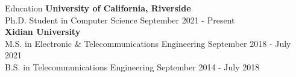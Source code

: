 \documentclass{resume} %
\begin{document}
\begin{rSection}{Education}
\textbf{University of California, Riverside}\\
Ph.D. Student in Computer Science \hfill {September 2021 - Present}\\
{\bf Xidian University} \\
M.S. in Electronic \& Telecommunications Engineering \hfill {September 2018 - July 2021}\\
B.S. in Telecommunications Engineering  \hfill {September 2014 - July 2018}\\
\end{rSection}
\end{document}
